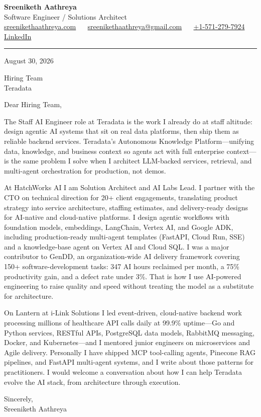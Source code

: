 \documentclass[11pt, letterpaper]{article}
\begin{document}
{\fontsize{18 pt}{20 pt}\selectfont\bfseries Sreeniketh Aathreya}\\[4pt]
Software Engineer / Solutions Architect\\[6pt]
\href{https://sreenikethaathreya.com}{sreenikethaathreya.com}
~\textbullet~
\href{mailto:sreenikethaathreya@gmail.com}{sreenikethaathreya@gmail.com}
~\textbullet~
\href{tel:+1-571-279-7924}{+1-571-279-7924}
~\textbullet~
\href{https://www.linkedin.com/in/sreeniketh-aathreya-16800b122/}{LinkedIn}

\vspace{12pt}
\hrule
\vspace{12pt}

August 30, 2026

\vspace{8pt}

Hiring Team\\
Teradata

\vspace{12pt}

Dear Hiring Team,

The Staff AI Engineer role at Teradata is the work I already do at staff altitude: design agentic AI systems that sit on real data platforms, then ship them as reliable backend services. Teradata's Autonomous Knowledge Platform---unifying data, knowledge, and business context so agents act with full enterprise context---is the same problem I solve when I architect LLM-backed services, retrieval, and multi-agent orchestration for production, not demos.

At HatchWorks AI I am Solution Architect and AI Labs Lead. I partner with the CTO on technical direction for 20+ client engagements, translating product strategy into service architecture, staffing estimates, and delivery-ready designs for AI-native and cloud-native platforms. I design agentic workflows with foundation models, embeddings, LangChain, Vertex AI, and Google ADK, including production-ready multi-agent templates (FastAPI, Cloud Run, SSE) and a knowledge-base agent on Vertex AI and Cloud SQL. I was a major contributor to GenDD, an organization-wide AI delivery framework covering 150+ software-development tasks: 347 AI hours reclaimed per month, a 75\% productivity gain, and a defect rate under 3\%. That is how I use AI-powered engineering to raise quality and speed without treating the model as a substitute for architecture.

On Lantern at i-Link Solutions I led event-driven, cloud-native backend work processing millions of healthcare API calls daily at 99.9\% uptime---Go and Python services, RESTful APIs, PostgreSQL data models, RabbitMQ messaging, Docker, and Kubernetes---and I mentored junior engineers on microservices and Agile delivery. Personally I have shipped MCP tool-calling agents, Pinecone RAG pipelines, and FastAPI multi-agent systems, and I write about those patterns for practitioners. I would welcome a conversation about how I can help Teradata evolve the AI stack, from architecture through execution.

Sincerely,\\[12pt]
Sreeniketh Aathreya
\end{document}
